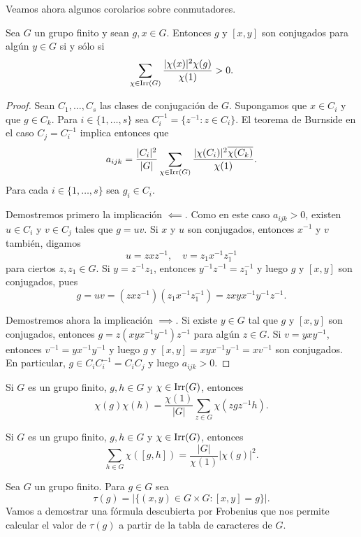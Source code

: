 Veamos ahora algunos corolarios sobre conmutadores. 

\begin{theorem}[Burnside]
Sea $G$ un grupo finito y sean $g,x\in G$. Entonces $g$ y $[x,y]$ son conjugados para algún $y\in G$ si y sólo si 
\[
\sum_{\chi\in\operatorname{Irr}(G)}\frac{|\chi(x)|^2\chi(g)}{\chi(1)}>0.
\]
\end{theorem}

\begin{proof}
Sean $C_1,\dots,C_s$ las clases de conjugación de $G$. Supongamos que $x\in C_i$ y que $g\in C_k$. 
Para $i\in\{1,\dots,s\}$ sea $C_i^{-1}=\{z^{-1}:z\in C_i\}$. El teorema de Burnside 
en el caso $C_j=C_i^{-1}$ implica entonces que
\[
a_{ijk}=\frac{|C_i|^2}{|G|}\sum_{\chi\in\operatorname{Irr}(G)}\frac{|\chi(C_i)|^2\overline{\chi(C_k)}}{\chi(1)}.
\]
Para cada $i\in\{1,\dots,s\}$ sea $g_i\in C_i$. 

Demostremos primero la implicación $\impliedby$. Como en este caso 
$a_{ijk}>0$, existen $u\in C_i$ y $v\in C_j$ tales que $g=uv$. Si $x$ y $u$ son conjugados, entonces
$x^{-1}$ y $v$ también, digamos
\[
u=zxz^{-1},\quad
v=z_1x^{-1}z_1^{-1}
\]
para ciertos $z,z_1\in G$. 
Si $y=z^{-1}z_1$, entonces $y^{-1}z^{-1}=z_1^{-1}$ y luego 
$g$ y $[x,y]$ son conjugados, pues 
\[
g=uv=(zxz^{-1})(z_1x^{-1}z_1^{-1})=zxyx^{-1}y^{-1}z^{-1}. 
\]

Demostremos ahora la implicación $\implies$. Si existe $y\in G$ tal que 
$g$ y $[x,y]$ son conjugados, entonces $g=z(xyx^{-1}y^{-1})z^{-1}$ para algún $z\in G$. Si $v=yxy^{-1}$, entonces
$v^{-1}=yx^{-1}y^{-1}$ y luego $g$ y 
$[x,y]=xyx^{-1}y^{-1}=xv^{-1}$ son conjugados. En particular, $g\in C_iC_i^{-1}=C_iC_j$ y luego $a_{ijk}>0$.  
\end{proof}

\begin{exercise}
    Si $G$ es un grupo finito, $g,h\in G$ y $\chi\in\operatorname{Irr}(G)$, entonces 
    \[
    \chi(g)\chi(h)=\frac{\chi(1)}{|G|}\sum_{z\in G}\chi(zgz^{-1}h).
    \]
\end{exercise}

\begin{exercise}
Si $G$ es un grupo finito, $g,h\in G$ y $\chi\in\operatorname{Irr}(G)$, entonces 
\[
\sum_{h\in G}\chi([g,h])=\frac{|G|}{\chi(1)}|\chi(g)|^2.
\]
\end{exercise}

Sea $G$ un grupo finito. Para $g\in G$ sea 
\[
\tau(g)=|\{(x,y)\in G\times G:[x,y]=g\}|.
\]
Vamos a demostrar una fórmula descubierta por Frobenius que nos permite calcular
el valor de $\tau(g)$ a partir de la tabla de caracteres de $G$. 

